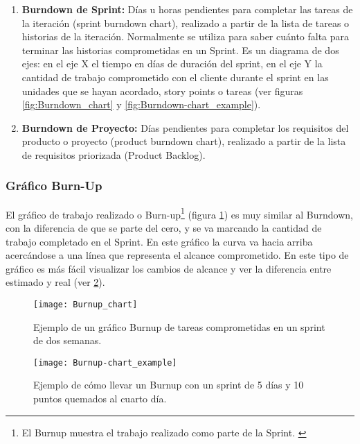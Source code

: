 \begin{enumerate}

\item \textbf{Burndown de Sprint:} Días u horas pendientes para completar las tareas de la iteración (sprint burndown chart), realizado a partir de la lista de tareas o historias de la iteración. Normalmente se utiliza para saber cuánto falta para terminar las historias comprometidas en un Sprint. Es un diagrama de dos ejes: en el eje X el tiempo en días de duración del sprint, en el eje Y la cantidad de trabajo comprometido con el cliente durante el sprint en las unidades que se hayan acordado, story points o tareas (ver figuras \ref{fig:Burndown_chart} y \ref{fig:Burndown-chart_example}).

\item \textbf{Burndown de Proyecto:} Días pendientes para completar los requisitos del producto o proyecto (product burndown chart), realizado a partir de la lista de requisitos priorizada (Product Backlog).

\end{enumerate}

\subsubsection{Gráfico Burn-Up}

El gráfico de trabajo realizado o Burn-up\footnote{El Burnup muestra el trabajo realizado como parte de la Sprint. \cite{SBOK-2013}} (figura \ref{fig:Burnup_chart}) es muy similar al Burndown, con la diferencia de que se parte del cero, y se va marcando la cantidad de trabajo completado en el Sprint. En este gráfico la curva va hacia arriba acercándose a una línea que representa el alcance comprometido. En este tipo de gráfico es más fácil visualizar los cambios de alcance y ver la diferencia entre estimado y real (ver \ref{fig:Burnup-chart_example}).

\begin{figure}[h]
  \centering
  \texttt{[image: Burnup\_chart]}
  \caption{Ejemplo de un gráfico Burnup de tareas comprometidas en un sprint de dos semanas.}
  \centering
  \label{fig:Burnup_chart} %
\end{figure}

\begin{figure}[h]
  \centering
  \texttt{[image: Burnup-chart\_example]}
  \caption{Ejemplo de cómo llevar un Burnup con un sprint de 5 días y 10 puntos quemados al cuarto día.}
  \centering
  \label{fig:Burnup-chart_example} %
\end{figure}

